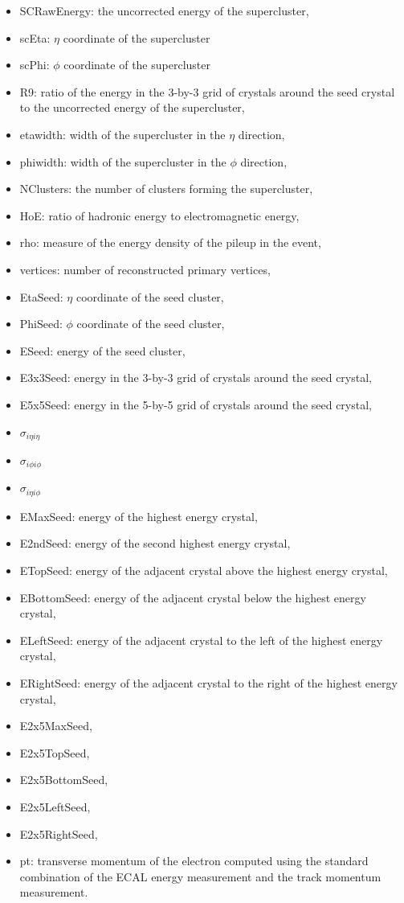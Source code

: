 \documentclass{cmspaper}
\begin{document}
\begin{itemize}
\item SCRawEnergy: the uncorrected energy of the supercluster,
\item scEta: $\eta$ coordinate of the supercluster
\item scPhi: $\phi$ coordinate of the supercluster
\item R9: ratio of the energy in the 3-by-3 grid of crystals around the seed crystal to the uncorrected energy of the supercluster,
\item etawidth: width of the supercluster in the $\eta$ direction,
\item phiwidth: width of the supercluster in the $\phi$ direction,
\item NClusters: the number of clusters forming the supercluster,
\item HoE: ratio of hadronic energy to electromagnetic energy,
\item rho: measure of the energy density of the pileup in the event,
\item vertices: number of reconstructed primary vertices,
\item EtaSeed: $\eta$ coordinate of the seed cluster,
\item PhiSeed: $\phi$ coordinate of the seed cluster,
\item ESeed: energy of the seed cluster,
\item E3x3Seed: energy in the 3-by-3 grid of crystals around the seed crystal, 
\item E5x5Seed: energy in the 5-by-5 grid of crystals around the seed crystal, 
\item $\sigma_{i\eta i\eta}$
\item $\sigma_{i\phi i\phi}$
\item $\sigma_{i\eta i\phi}$
\item EMaxSeed: energy of the highest energy crystal,
\item E2ndSeed: energy of the second highest energy crystal,
\item ETopSeed: energy of the adjacent crystal above the highest energy crystal,
\item EBottomSeed: energy of the adjacent crystal below the highest energy crystal,
\item ELeftSeed: energy of the adjacent crystal to the left of the highest energy crystal,
\item ERightSeed: energy of the adjacent crystal to the right of the highest energy crystal,
\item E2x5MaxSeed,
\item E2x5TopSeed,
\item E2x5BottomSeed,
\item E2x5LeftSeed,
\item E2x5RightSeed,
\item pt: transverse momentum of the electron computed using the standard combination of the ECAL energy measurement and the track momentum measurement.
\end{itemize}
\end{document}
